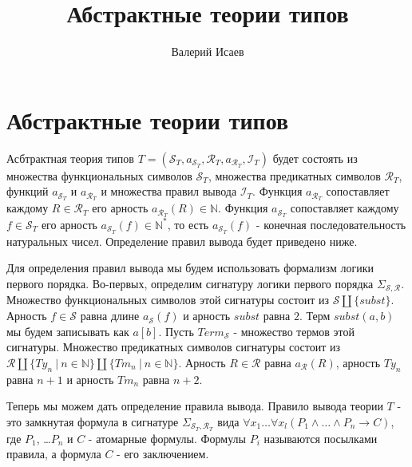 \documentclass{amsart}
\theoremstyle{definition}
\theoremstyle{remark}
\numberwithin{figure}{section}
\begin{document}
\title{Абстрактные теории типов}

\author{Валерий Исаев}


\maketitle

\section{Абстрактные теории типов}

Асбтрактная теория типов $T = (\mathcal{S}_T, a_{\mathcal{S}_T}, \mathcal{R}_T, a_{\mathcal{R}_T}, \mathcal{I}_T)$ будет состоять из множества функциональных символов $\mathcal{S}_T$, множества предикатных символов $\mathcal{R}_T$, функций $a_{\mathcal{S}_T}$ и $a_{\mathcal{R}_T}$ и множества правил вывода $\mathcal{I}_T$.
Функция $a_{\mathcal{R}_T}$ сопоставляет каждому $R \in \mathcal{R}_T$ его арность $a_{\mathcal{R}_T}(R) \in \mathbb{N}$.
Функция $a_{\mathcal{S}_T}$ сопоставляет каждому $f \in \mathcal{S}_T$ его арность $a_{\mathcal{S}_T}(f) \in \mathbb{N}^*$, то есть $a_{\mathcal{S}_T}(f)$ - конечная последовательность натуральных чисел.
Определение правил вывода будет приведено ниже.

Для определения правил вывода мы будем использовать формализм логики первого порядка.
Во-первых, определим сигнатуру логики первого порядка $\Sigma_{\mathcal{S}, \mathcal{R}}$.
Множество функциональных символов этой сигнатуры состоит из $\mathcal{S} \amalg \{ subst \}$.
Арность $f \in \mathcal{S}$ равна длине $a_\mathcal{S}(f)$ и арность $subst$ равна $2$.
Терм $subst(a, b)$ мы будем записывать как $a[b]$.
Пусть $Term_{\mathcal{S}}$ - множество термов этой сигнатуры.
Множество предикатных символов сигнатуры состоит из $\mathcal{R} \amalg \{ Ty_n\ |\ n \in \mathbb{N} \} \amalg \{ Tm_n\ |\ n \in \mathbb{N} \}$.
Арность $R \in \mathcal{R}$ равна $a_\mathcal{R}(R)$, арность $Ty_n$ равна $n + 1$ и арность $Tm_n$ равна $n + 2$.

Теперь мы можем дать определение правила вывода.
Правило вывода теории $T$ - это замкнутая формула в сигнатуре $\Sigma_{\mathcal{S}_T, \mathcal{R}_T}$ вида $\forall x_1 \ldots \forall x_l (P_1 \land \ldots \land P_n \to C)$, где $P_1$, \ldots $P_n$ и $C$ - атомарные формулы.
Формулы $P_i$ называются посылками правила, а формула $C$ - его заключением.
\end{document}
